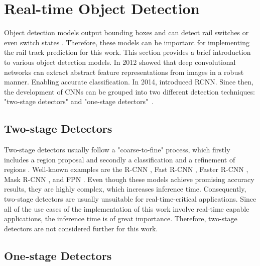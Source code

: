 \section{Real-time Object Detection}
\label{sec:ObjectDetection}

Object detection models output bounding boxes and can detect rail switches or even switch states \cite{railsem19dataset}.
Therefore, these models can be important for implementing the rail track prediction for this work.
This section provides a brief introduction to various object detection models.
In 2012 \cite{AlexNet2012} showed that deep convolutional networks can extract abstract feature representations from images in a robust manner.
Enabling accurate classification.
In 2014, \cite{RCNN2014} introduced \ac{RCNN}.
Since then, the development of \ac{CNN}s can be grouped into two different detection techniques: "two-stage detectors" and "one-stage detectors"~\cite{20yearsSurvey, surveyObjectDetection, surveyObjectDetection2019}.

\vspace{0.5cm}

\subsection{Two-stage Detectors}

Two-stage detectors usually follow a "coarse-to-fine" process, which firstly includes a region proposal and secondly a classification and a refinement of regions \cite{20yearsSurvey, surveyObjectDetection, surveyObjectDetection2019, twostageObjectDetection}.
Well-known examples are the R-CNN \cite{RCNN2014}, Fast R-CNN \cite{FastRCNN2015}, Faster R-CNN \cite{FasterRCNN2017}, Mask R-CNN \cite{MaskRCNN2017}, and \ac{FPN} \cite{FPN2017_two_stage-detector}.
Even though these models achieve promising accuracy results, they are highly complex, which increases inference time.
Consequently, two-stage detectors are usually unsuitable for real-time-critical applications.
Since all of the use cases of the implementation of this work involve real-time capable applications, the inference time is of great importance.
Therefore, two-stage detectors are not considered further for this work.

\vspace{0.5cm}

\subsection{One-stage Detectors}

